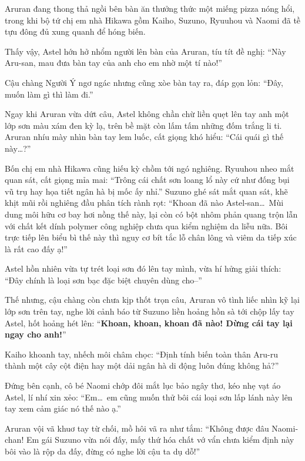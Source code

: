 \documentclass[../main.tex]{subfiles}
\begin{document}
Aruran đang thong thả ngồi bên bàn ăn thưởng thức một miếng pizza nóng hổi, trong khi bộ tứ chị em nhà Hikawa gồm Kaiho, Suzuno, Ryuuhou và Naomi đã tề tựu đông đủ xung quanh để hóng biến.

Thấy vậy, Astel hớn hở nhổm người lên bàn của Aruran, tíu tít đề nghị: ``Này Aru-san, mau đưa bàn tay của anh cho em nhờ một tí nào!''

Cậu chàng Người Ý ngơ ngác nhưng cũng xòe bàn tay ra, đáp gọn lỏn: ``Đây, muốn làm gì thì làm đi.''

Ngay khi Aruran vừa dứt câu, Astel không chần chừ liền quẹt lên tay anh một lớp sơn màu xám đen kỳ lạ, trên bề mặt còn lấm tấm những đốm trắng li ti. Aruran nhíu mày nhìn bàn tay lem luốc, cất giọng khó hiểu: ``Cái quái gì thế này\dots?''


Bốn chị em nhà Hikawa cũng hiếu kỳ chồm tới ngó nghiêng. Ryuuhou nheo mắt quan sát, cất giọng mỉa mai: ``Trông cái chất sơn loang lổ này cứ như đống bụi vũ trụ hay họa tiết ngân hà bị mốc ấy nhỉ.'' Suzuno ghé sát mắt quan sát, khẽ khịt mũi rồi nghiêng đầu phân tích rành rọt: ``Khoan đã nào Astel-san\dots\ Mùi dung môi hữu cơ bay hơi nồng thế này, lại còn có bột nhôm phản quang trộn lẫn với chất kết dính polymer công nghiệp chưa qua kiểm nghiệm da liễu nữa. Bôi trực tiếp lên biểu bì thế này thì nguy cơ bít tắc lỗ chân lông và viêm da tiếp xúc là rất cao đấy ạ!''

Astel hồn nhiên vừa tự trét loại sơn đó lên tay mình, vừa hí hửng giải thích: ``Đây chính là loại sơn bạc đặc biệt chuyên dùng cho--''

Thế nhưng, cậu chàng còn chưa kịp thốt trọn câu, Aruran vô tình liếc nhìn kỹ lại lớp sơn trên tay, nghe lời cảnh báo từ Suzuno liền hoảng hồn sà tới chộp lấy tay Astel, hốt hoảng hét lên: ``\textbf{Khoan, khoan, khoan đã nào! Dừng cái tay lại ngay cho anh!}''

Kaiho khoanh tay, nhếch môi châm chọc: ``Định tính biến toàn thân Aru-ru thành một cây cột điện hay một dải ngân hà di động luôn đúng không hả?''

Đứng bên cạnh, cô bé Naomi chớp đôi mắt lục bảo ngây thơ, kéo nhẹ vạt áo Astel, lí nhí xin xẻo: ``Em\dots\ em cũng muốn thử bôi cái loại sơn lấp lánh này lên tay xem cảm giác nó thế nào ạ.''

Aruran vội vã khuơ tay từ chối, mồ hôi vã ra như tắm: ``Không được đâu Naomi-chan! Em gái Suzuno vừa nói đấy, mấy thứ hóa chất vớ vẩn chưa kiểm định này bôi vào là rộp da đấy, đừng có nghe lời cậu ta dụ dỗ!''
\end{document}
